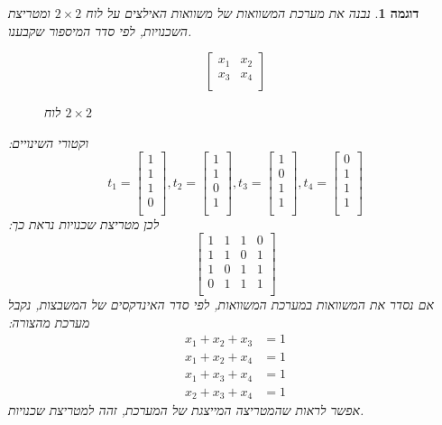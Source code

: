 \documentclass[12pt,leqno]{article}
\theoremstyle{theoremdd}
\newtheorem{example}{דוגמה}[section]
\begin{document}
\begin{example}
    נבנה את מערכת המשוואות
    של משוואות האילצים 
    על לוח 
    $2 \times 2$
    ומטריצת השכנויות,
    לפי סדר המיספור שקבענו.

    \begin{figure}[ht]
        \caption{לוח 
        $2 \times 2$
        }
        \label{fig: 2 x 2 board}
        \centering
        \[
            \begin{bmatrix}
                x_1 & x_2 \\
                x_3 & x_4 \\
            \end{bmatrix}
        \]
    \end{figure}

    וקטורי השינויים:
    \[
       t_1 = 
        \begin{bmatrix}
            1 \\
            1 \\
            1 \\
            0 \\
        \end{bmatrix},
        t_2 = 
        \begin{bmatrix}
            1 \\
            1 \\
            0 \\
            1 \\
        \end{bmatrix},
        t_3 = 
        \begin{bmatrix}
            1 \\
            0 \\
            1 \\
            1 \\
        \end{bmatrix},
        t_4 = 
        \begin{bmatrix}
            0 \\
            1 \\
            1 \\
            1 \\
        \end{bmatrix}
    \]
    לכן
    מטריצת שכנויות נראת כך:
    \[
        \begin{bmatrix}
            1 & 1 & 1 &0 \\
            1 & 1 & 0 & 1 \\
            1 & 0 & 1 & 1 \\
            0 & 1 & 1 & 1 \\
        \end{bmatrix}
    \]
    אם נסדר את המשוואות במערכת המשוואות, לפי סדר 
    האינדקסים של המשבצות, נקבל מערכת מהצורה:
    \begin{align*}
        x_1 + x_2 + x_3 &= 1\\
        x_1 + x_2 + x_4 &= 1\\
        x_1 + x_3 + x_4 &= 1\\
        x_2 + x_3 + x_4 &= 1
    \end{align*}
    אפשר לראות שהמטריצה המייצגת של המערכת, זהה למטריצת שכנויות.
    

\end{example}
\end{document}
